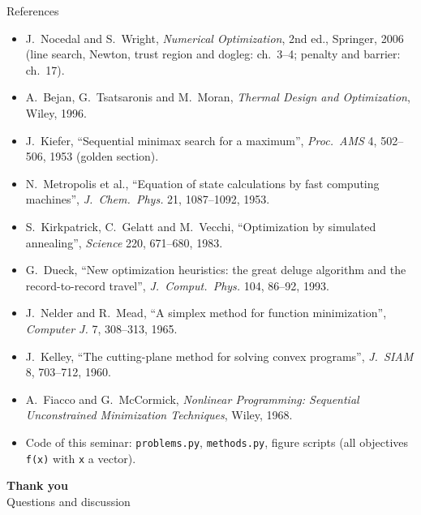 \documentclass[aspectratio=169,10pt]{beamer}
\begin{document}
\begin{frame}{References}
  \footnotesize
  \begin{itemize}
    \item J.\ Nocedal and S.\ Wright, \emph{Numerical Optimization}, 2nd ed., Springer, 2006 (line search, Newton, trust region and dogleg: ch.\ 3--4; penalty and barrier: ch.\ 17).
    \item A.\ Bejan, G.\ Tsatsaronis and M.\ Moran, \emph{Thermal Design and Optimization}, Wiley, 1996.
    \item J.\ Kiefer, ``Sequential minimax search for a maximum'', \emph{Proc.\ AMS} 4, 502--506, 1953 (golden section).
    \item N.\ Metropolis et al., ``Equation of state calculations by fast computing machines'', \emph{J.\ Chem.\ Phys.} 21, 1087--1092, 1953.
    \item S.\ Kirkpatrick, C.\ Gelatt and M.\ Vecchi, ``Optimization by simulated annealing'', \emph{Science} 220, 671--680, 1983.
    \item G.\ Dueck, ``New optimization heuristics: the great deluge algorithm and the record-to-record travel'', \emph{J.\ Comput.\ Phys.} 104, 86--92, 1993.
    \item J.\ Nelder and R.\ Mead, ``A simplex method for function minimization'', \emph{Computer J.} 7, 308--313, 1965.
    \item J.\ Kelley, ``The cutting-plane method for solving convex programs'', \emph{J.\ SIAM} 8, 703--712, 1960.
    \item A.\ Fiacco and G.\ McCormick, \emph{Nonlinear Programming: Sequential Unconstrained Minimization Techniques}, Wiley, 1968.
    \item Code of this seminar: \texttt{problems.py}, \texttt{methods.py}, figure scripts (all objectives \texttt{f(x)} with \texttt{x} a vector).
  \end{itemize}
\end{frame}

\begin{frame}[plain]
  \centering\vfill
  {\Large\bfseries Thank you}\\[0.4cm]
  Questions and discussion\vfill
\end{frame}
\end{document}
